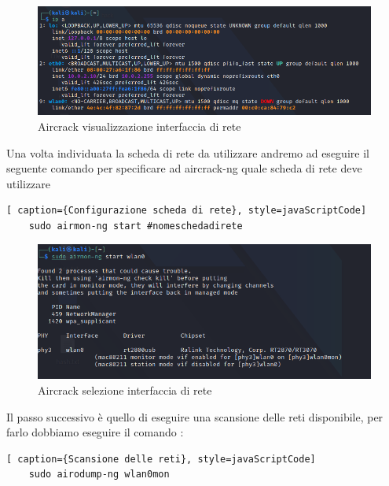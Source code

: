 \begin{figure}[h!]
    \centering
    \includegraphics[width=\linewidth]{Immagini/6/aircrack_1.png}
    \caption{Aircrack visualizzazione interfaccia di rete}
\end{figure}

\newpage

Una volta individuata la scheda di rete da utilizzare andremo ad eseguire il seguente comando per specificare ad aircrack-ng quale scheda di rete deve utilizzare

\begin{lstlisting}[ caption={Configurazione scheda di rete}, style=javaScriptCode]
	sudo airmon-ng start #nomeschedadirete
\end{lstlisting}

\begin{figure}[ht]
    \centering
    \includegraphics[width=\linewidth]{Immagini/6/aircrack_2.png}
    \caption{Aircrack selezione interfaccia di rete}
\end{figure}

Il passo successivo è quello di eseguire una scansione delle reti disponibile, per farlo dobbiamo eseguire il comando :

\begin{lstlisting}[ caption={Scansione delle reti}, style=javaScriptCode]
	sudo airodump-ng wlan0mon
\end{lstlisting}


